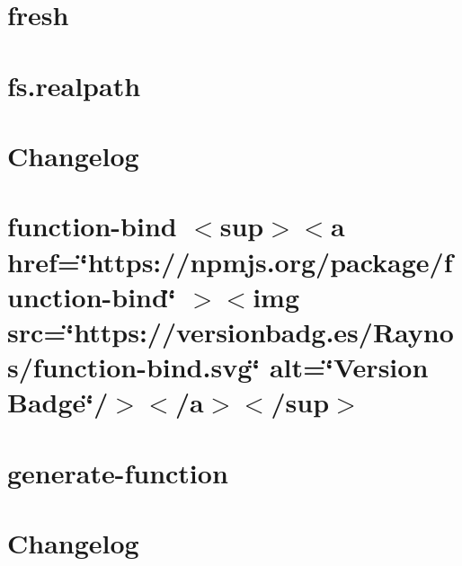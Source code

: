\documentclass[twoside]{book}
\newcommand{\+}{\discretionary{\mbox{\scriptsize$\hookleftarrow$}}{}{}}
\begin{document}
\chapter{fresh}
\label{md_Backend_nodejs_node_modules_fresh_README}

\chapter{fs.\+realpath}
\label{md_Backend_nodejs_node_modules_fs_realpath_README}

\chapter{Changelog}
\label{md_Backend_nodejs_node_modules_function_bind_CHANGELOG}

\chapter{function-\/bind \texorpdfstring{$<$}{<}sup\texorpdfstring{$>$}{>}\texorpdfstring{$<$}{<}a href=\char`\"{}https\+://npmjs.\+org/package/function-\/bind\char`\"{} \texorpdfstring{$>$}{>}\texorpdfstring{$<$}{<}img src=\char`\"{}https\+://versionbadg.\+es/\+Raynos/function-\/bind.\+svg\char`\"{} alt=\char`\"{}\+Version Badge\char`\"{}/\texorpdfstring{$>$}{>}\texorpdfstring{$<$}{<}/a\texorpdfstring{$>$}{>}\texorpdfstring{$<$}{<}/sup\texorpdfstring{$>$}{>}}
\label{md_Backend_nodejs_node_modules_function_bind_README}

\chapter{generate-\/function}
\label{md_Backend_nodejs_node_modules_generate_function_README}

\chapter{Changelog}
\label{md_Backend_nodejs_node_modules_get_intrinsic_CHANGELOG}

\end{document}
